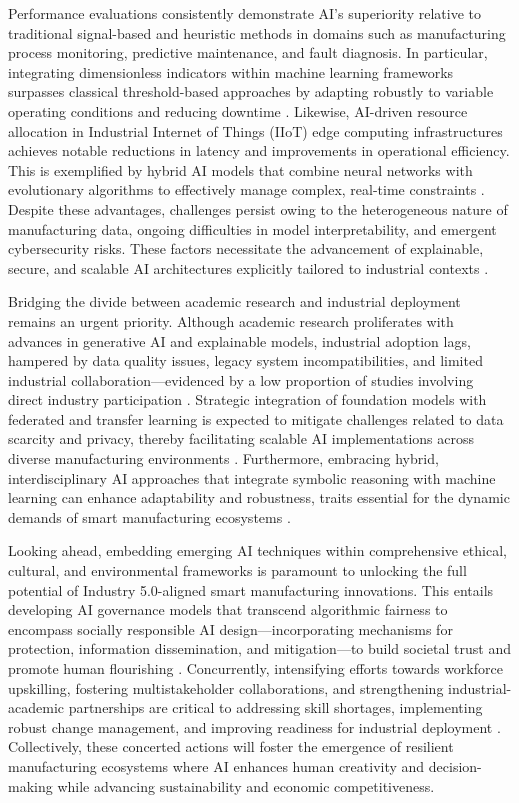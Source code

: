 \documentclass[sigconf]{acmart}
\begin{document}
Performance evaluations consistently demonstrate AI’s superiority relative to traditional signal-based and heuristic methods in domains such as manufacturing process monitoring, predictive maintenance, and fault diagnosis. In particular, integrating dimensionless indicators within machine learning frameworks surpasses classical threshold-based approaches by adapting robustly to variable operating conditions and reducing downtime \cite{ref4,ref32}. Likewise, AI-driven resource allocation in Industrial Internet of Things (IIoT) edge computing infrastructures achieves notable reductions in latency and improvements in operational efficiency. This is exemplified by hybrid AI models that combine neural networks with evolutionary algorithms to effectively manage complex, real-time constraints \cite{ref31,ref34}. Despite these advantages, challenges persist owing to the heterogeneous nature of manufacturing data, ongoing difficulties in model interpretability, and emergent cybersecurity risks. These factors necessitate the advancement of explainable, secure, and scalable AI architectures explicitly tailored to industrial contexts \cite{ref29,ref35,ref39}.

Bridging the divide between academic research and industrial deployment remains an urgent priority. Although academic research proliferates with advances in generative AI and explainable models, industrial adoption lags, hampered by data quality issues, legacy system incompatibilities, and limited industrial collaboration—evidenced by a low proportion of studies involving direct industry participation \cite{ref3,ref7}. Strategic integration of foundation models with federated and transfer learning is expected to mitigate challenges related to data scarcity and privacy, thereby facilitating scalable AI implementations across diverse manufacturing environments \cite{ref5,ref8}. Furthermore, embracing hybrid, interdisciplinary AI approaches that integrate symbolic reasoning with machine learning can enhance adaptability and robustness, traits essential for the dynamic demands of smart manufacturing ecosystems \cite{ref35,ref37}.

Looking ahead, embedding emerging AI techniques within comprehensive ethical, cultural, and environmental frameworks is paramount to unlocking the full potential of Industry 5.0-aligned smart manufacturing innovations. This entails developing AI governance models that transcend algorithmic fairness to encompass socially responsible AI design—incorporating mechanisms for protection, information dissemination, and mitigation—to build societal trust and promote human flourishing \cite{ref25}. Concurrently, intensifying efforts towards workforce upskilling, fostering multistakeholder collaborations, and strengthening industrial-academic partnerships are critical to addressing skill shortages, implementing robust change management, and improving readiness for industrial deployment \cite{ref2,ref3,ref21}. Collectively, these concerted actions will foster the emergence of resilient manufacturing ecosystems where AI enhances human creativity and decision-making while advancing sustainability and economic competitiveness.
\end{document}
